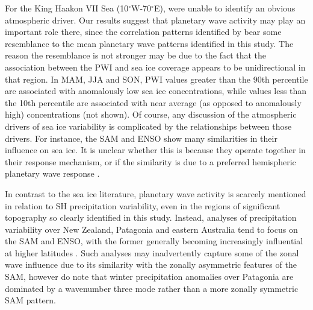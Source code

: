For the King Haakon VII Sea (10$^{\circ}$W-70$^{\circ}$E), \citet{Raphael2014} were unable to identify an obvious atmospheric driver. Our results suggest that planetary wave activity may play an important role there, since the correlation patterns identified by \citet{Raphael2014} bear some resemblance to the mean planetary wave patterns identified in this study. The reason the resemblance is not stronger may be due to the fact that the association between the PWI and sea ice coverage appears to be unidirectional in that region. In MAM, JJA and SON, PWI values greater than the 90th percentile are associated with anomalously low sea ice concentrations, while values less than the 10th percentile are associated with near average (as opposed to anomalously high) concentrations (not shown). Of course, any discussion of the atmospheric drivers of sea ice variability is complicated by the relationships between those drivers. For instance, the SAM and ENSO show many similarities in their influence on sea ice. It is unclear whether this is because they operate together in their response mechanism, or if the similarity is due to a preferred hemispheric planetary wave response \citep[e.g.][]{Pezza2012}. 

In contrast to the sea ice literature, planetary wave activity is scarcely mentioned in relation to SH precipitation variability, even in the regions of significant topography so clearly identified in this study. Instead, analyses of precipitation variability over New Zealand, Patagonia and eastern Australia tend to focus on the SAM and ENSO, with the former generally becoming increasingly influential at higher latitudes \citep[e.g.][]{Ummenhofer2007,Aravena2009,Kidston2009,Risbey2009,Garreaud2013,Jiang2013}. Such analyses may inadvertently capture some of the zonal wave influence due to its similarity with the zonally asymmetric features of the SAM, however \citet{Garreaud2013} do note that winter precipitation anomalies over Patagonia are dominated by a wavenumber three mode rather than a more zonally symmetric SAM pattern.

